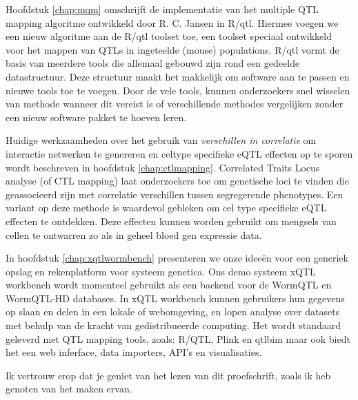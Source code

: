Hoofdstuk \ref{chap:mqm} omschrijft de implementatie van het multiple QTL mapping algoritme ontwikkeld door 
R. C. Jansen in R/qtl. Hiermee voegen we een nieuw algoritme aan de R/qtl toolset toe, een 
toolset speciaal ontwikkeld voor het mappen van QTLs in ingeteelde (mouse) populations. R/qtl 
vormt de basis van meerdere tools die allemaal gebouwd zijn rond een gedeelde datastructuur. 
Deze structuur maakt het makkelijk om software aan te passen en nieuwe tools toe te voegen.
Door de vele tools, kunnen onderzoekers snel wisselen van methode wanneer dit vereist is of 
verschillende methodes vergelijken zonder een nieuw software pakket te hoeven leren.

Huidige werkzaamheden over het gebruik van \emph{verschillen in correlatie} om interactie 
netwerken te genereren en celtype specifieke eQTL effecten op te sporen wordt beschreven in 
hoofdstuk \ref{chap:ctlmapping}. Correlated Traits Locus analyse (of CTL mapping) laat 
onderzoekers toe om genetische loci te vinden die geassocieerd zijn met correlatie verschillen 
tussen segregerende phenotypes. Een variant op deze methode is waardevol gebleken om cel 
type specifieke eQTL effecten te ontdekken. Deze effecten kunnen worden gebruikt om mengsels 
van cellen te ontwarren zo als in geheel bloed gen expressie data.

In hoofdstuk \ref{chap:xqtlwormbench} presenteren we onze idee\"en voor een generiek opslag en rekenplatform 
voor systeem genetica. Ons demo systeem xQTL workbench wordt momenteel gebruikt als een 
backend voor de WormQTL en WormQTL-HD databases. In xQTL workbench kunnen gebruikers hun 
gegevens op slaan en delen in een lokale of webomgeving, en lopen analyse over datasets met 
behulp van de kracht van gedistribueerde computing. Het wordt standaard geleverd met QTL 
mapping tools, zoals: R/QTL, Plink en qtlbim maar ook biedt het een web inferface, data 
importers, API's en visualisaties.

Ik vertrouw erop dat je geniet van het lezen van dit proefschrift, zoals ik heb genoten van het maken 
ervan.

\newpage
